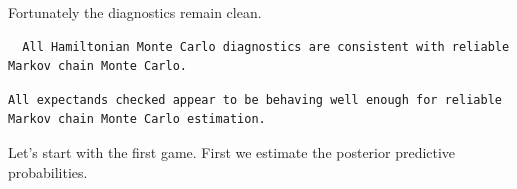 \documentclass[
  letterpaper,
  DIV=11,
  numbers=noendperiod]{scrartcl}
\newenvironment{Shaded}{\begin{snugshade}}{\end{snugshade}}
\newcommand{\AttributeTok}[1]{\textcolor[rgb]{0.40,0.45,0.13}{#1}}
\newcommand{\ConstantTok}[1]{\textcolor[rgb]{0.56,0.35,0.01}{#1}}
\newcommand{\FunctionTok}[1]{\textcolor[rgb]{0.28,0.35,0.67}{#1}}
\newcommand{\NormalTok}[1]{\textcolor[rgb]{0.00,0.23,0.31}{#1}}
\newcommand{\OtherTok}[1]{\textcolor[rgb]{0.00,0.23,0.31}{#1}}
\newcommand{\SpecialCharTok}[1]{\textcolor[rgb]{0.37,0.37,0.37}{#1}}
\newcommand{\StringTok}[1]{\textcolor[rgb]{0.13,0.47,0.30}{#1}}
\begin{document}
Fortunately the diagnostics remain clean.

\begin{Shaded}
\end{Shaded}

\begin{verbatim}
  All Hamiltonian Monte Carlo diagnostics are consistent with reliable
Markov chain Monte Carlo.
\end{verbatim}

\begin{Shaded}
\end{Shaded}

\begin{verbatim}
All expectands checked appear to be behaving well enough for reliable
Markov chain Monte Carlo estimation.
\end{verbatim}

Let's start with the first game. First we estimate the posterior
predictive probabilities.
\end{document}
